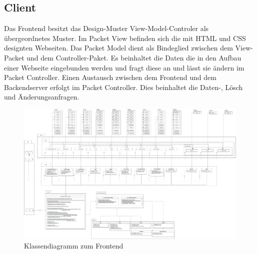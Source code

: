 \subsection{Client}
Das Frontend besitzt das Design-Muster View-Model-Controler als übergeordnetes Muster. Im Packet \glqq View\grqq{} befinden sich die mit HTML und CSS designten Webseiten. Das Packet \glqq Model\grqq{} dient als Bindeglied zwischen dem \glqq View\grqq{}-Packet und dem \glqq Controller\grqq{}-Paket. Es beinhaltet die Daten die in den Aufbau einer Webseite eingebunden werden und fragt diese an und lässt sie ändern im Packet \glqq Controller\grqq{}. Einen Austausch zwischen dem Frontend und dem Backendserver erfolgt im Packet \glqq Controller\grqq{}. Dies beinhaltet die Daten-, Lösch und Änderungsanfragen.

\begin{figure}[H]
\centerline{\includegraphics[scale=0.2]{res/FrontendUML.drawio.pdf}}
\caption{Klassendiagramm zum Frontend}
\end{figure}

\newpage